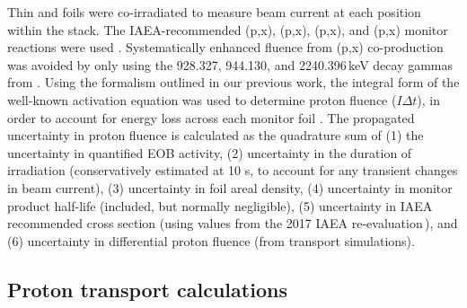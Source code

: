 Thin  and  foils  
were co-irradiated to measure beam current at each position within the stack.
The IAEA-recommended (p,x), (p,x),  (p,x), and (p,x) monitor reactions were used 
\cite{Hermanne2018}.
Systematically enhanced fluence from (p,x) co-production was avoided by only using the 928.327, 944.130, and 2240.396\,keV decay gammas  from .
Using the formalism outlined in our previous work, the integral form of the well-known activation equation was used to  determine proton fluence ($I \Delta t $),
in order to account for energy loss across each monitor foil \cite{Voyles2018a}.
The propagated uncertainty in proton fluence is calculated as the quadrature sum of (1) the uncertainty in quantified EOB activity, (2) uncertainty in the duration of irradiation (conservatively estimated at 10 s, to account for any transient changes in beam current), (3) uncertainty in foil areal density, (4) uncertainty in monitor product half-life (included, but normally negligible), (5) uncertainty in IAEA recommended cross section (using values  from the 2017 IAEA re-evaluation\,\cite{Hermanne2018}), and (6) uncertainty in differential proton fluence (from transport simulations).






\subsection{\label{sec:proton_transport_fe}Proton transport calculations}

